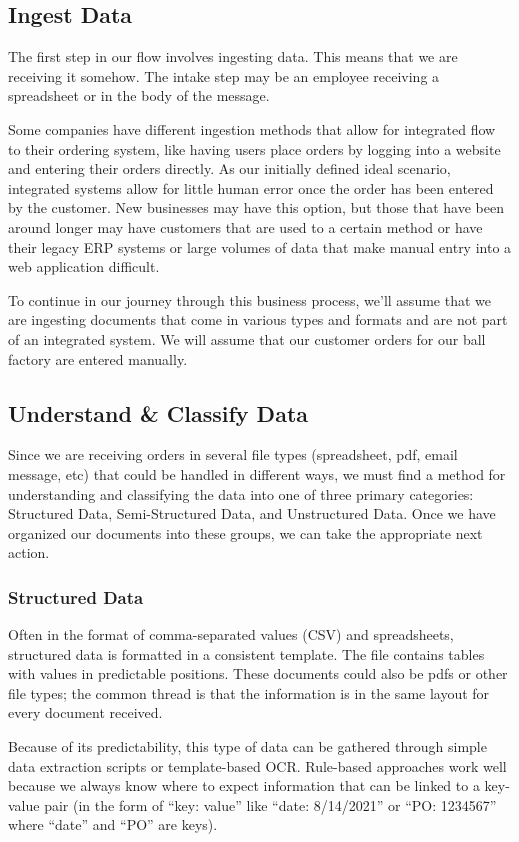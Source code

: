 \documentclass[conference]{IEEEtran}
\begin{document}
\subsection{Ingest Data}
The first step in our flow involves ingesting data. This means that we are receiving it somehow. The intake step may be an employee receiving a spreadsheet or in the body of the message.

Some companies have different ingestion methods that allow for integrated flow to their ordering system, like having users place orders by logging into a website and entering their orders directly. As our initially defined ideal scenario, integrated systems allow for little human error once the order has been entered by the customer. New businesses may have this option, but those that have been around longer may have customers that are used to a certain method or have their legacy ERP systems or large volumes of data that make manual entry into a web application difficult.

To continue in our journey through this business process, we'll assume that we are ingesting documents that come in various types and formats and are not part of an integrated system. We will assume that our customer orders for our ball factory are entered manually.

\subsection{Understand \& Classify Data}
Since we are receiving orders in several file types (spreadsheet, pdf, email message, etc) that could be handled in different ways, we must find a method for understanding and classifying the data into one of three primary categories: Structured Data, Semi-Structured Data, and Unstructured Data. Once we have organized our documents into these groups, we can take the appropriate next action.

\subsubsection{Structured Data}
Often in the format of comma-separated values (CSV) and spreadsheets, structured data is formatted in a consistent template. The file contains tables with values in predictable positions. These documents could also be pdfs or other file types; the common thread is that the information is in the same layout for every document received.

Because of its predictability, this type of data can be gathered through simple data extraction scripts or template-based OCR. Rule-based approaches work well because we always know where to expect information that can be linked to a key-value pair (in the form of ``key: value'' like ``date: 8/14/2021'' or ``PO: 1234567'' where ``date'' and ``PO'' are keys).
\end{document}
